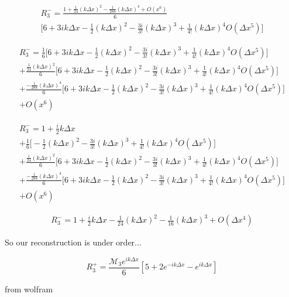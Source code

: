 \documentclass[12pt]{article}
\begin{document}
\begin{multline}
R_3^-= \frac{1 + \frac{1}{24} (k\Delta x)^2 - \frac{1}{288} (k\Delta x)^4 + O(x^{6})}{6} \\ \Bigg[6 + 3i k\Delta x - \frac{1}{2} (k\Delta x)^2 -\frac{3i}{3!} (k\Delta x)^3 +  \frac{1}{4!} (k\Delta x)^4   O( \Delta x^5) \Bigg] 
\end{multline}

\begin{multline}
R_3^-= \frac{1}{6}\Bigg[6 + 3i k\Delta x - \frac{1}{2} (k\Delta x)^2 -\frac{3i}{3!} (k\Delta x)^3 +  \frac{1}{4!} (k\Delta x)^4   O( \Delta x^5) \Bigg] \\ + \frac{\frac{1}{24} (k \Delta x)^2}{6} \Bigg[6 + 3i k\Delta x - \frac{1}{2} (k\Delta x)^2 -\frac{3i}{3!} (k\Delta x)^3 +  \frac{1}{4!} (k\Delta x)^4   O( \Delta x^5) \Bigg]  \\+ \frac{- \frac{1}{288} (k\Delta x)^4}{6} \Bigg[6 + 3i k\Delta x - \frac{1}{2} (k\Delta x)^2 -\frac{3i}{3!} (k\Delta x)^3 +  \frac{1}{4!} (k\Delta x)^4   O( \Delta x^5) \Bigg] \\  + O(x^{6})
\end{multline}

\begin{multline}
R_3^-= 1 + \frac{i}{2}k\Delta x \\ +
\frac{1}{6}\Bigg[ - \frac{1}{2} (k\Delta x)^2 -\frac{3i}{3!} (k\Delta x)^3 +  \frac{1}{4!} (k\Delta x)^4   O( \Delta x^5) \Bigg] \\ + \frac{\frac{1}{24} (k \Delta x)^2}{6} \Bigg[6 + 3i k\Delta x - \frac{1}{2} (k\Delta x)^2 -\frac{3i}{3!} (k\Delta x)^3 +  \frac{1}{4!} (k\Delta x)^4   O( \Delta x^5) \Bigg]  \\+ \frac{- \frac{1}{288} (k\Delta x)^4}{6} \Bigg[6 + 3i k\Delta x - \frac{1}{2} (k\Delta x)^2 -\frac{3i}{3!} (k\Delta x)^3 +  \frac{1}{4!} (k\Delta x)^4   O( \Delta x^5) \Bigg] \\  + O(x^{6})
\end{multline}

\begin{multline}
R_3^-= 1 + \frac{i}{2}k\Delta x - \frac{1}{24} (k \Delta x)^2 - \frac{1}{16} (k \Delta x)^3 +  O( \Delta x^4) 
\end{multline}

So our reconstruction is under order...

\[R_3^+= \frac{\mathcal{M}_3 e^{ik\Delta x }}{6}\left[5 + 2e^{-ik\Delta x} - e^{ik\Delta x} \right]\] 

from wolfram
\end{document}
